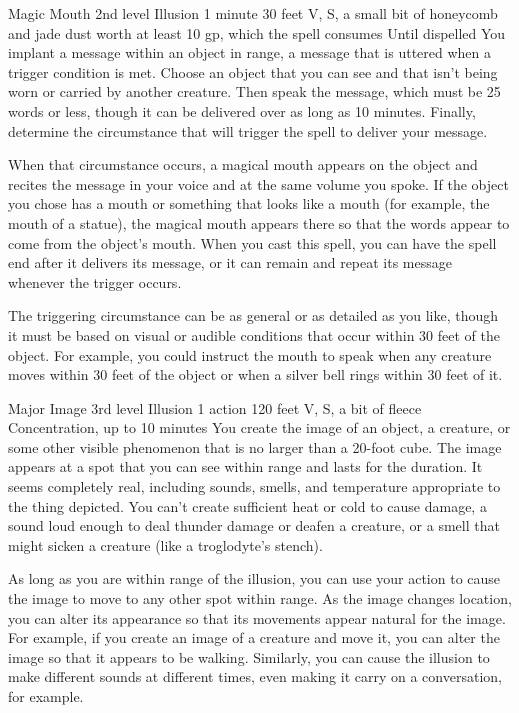 \documentclass[10pt,a4paper,twoside,bg=print,twocolumn,openany,nodeprecatedcode]{dndbook}
\begin{document}


\DndSpellHeader%
{Magic Mouth}
{2nd level Illusion}
{1 minute}
{30 feet}
{V, S, a small bit of honeycomb and jade dust worth at least 10 gp, which the spell consumes}
{Until dispelled}
You implant a message within an object in range, a message that is uttered when a trigger condition is met. Choose an object that you can see and that isn't being worn or carried by another creature. Then speak the message, which must be 25 words or less, though it can be delivered over as long as 10 minutes. Finally, determine the circumstance that will trigger the spell to deliver your message.

When that circumstance occurs, a magical mouth appears on the object and recites the message in your voice and at the same volume you spoke. If the object you chose has a mouth or something that looks like a mouth (for example, the mouth of a statue), the magical mouth appears there so that the words appear to come from the object's mouth. When you cast this spell, you can have the spell end after it delivers its message, or it can remain and repeat its message whenever the trigger occurs.

The triggering circumstance can be as general or as detailed as you like, though it must be based on visual or audible conditions that occur within 30 feet of the object. For example, you could instruct the mouth to speak when any creature moves within 30 feet of the object or when a silver bell rings within 30 feet of it.



\DndSpellHeader%
{Major Image}
{3rd level Illusion}
{1 action}
{120 feet}
{V, S, a bit of fleece}
{Concentration, up to 10 minutes}
You create the image of an object, a creature, or some other visible phenomenon that is no larger than a 20-foot cube. The image appears at a spot that you can see within range and lasts for the duration. It seems completely real, including sounds, smells, and temperature appropriate to the thing depicted. You can't create sufficient heat or cold to cause damage, a sound loud enough to deal thunder damage or deafen a creature, or a smell that might sicken a creature (like a troglodyte's stench).

As long as you are within range of the illusion, you can use your action to cause the image to move to any other spot within range. As the image changes location, you can alter its appearance so that its movements appear natural for the image. For example, if you create an image of a creature and move it, you can alter the image so that it appears to be walking. Similarly, you can cause the illusion to make different sounds at different times, even making it carry on a conversation, for example.
\end{document}
